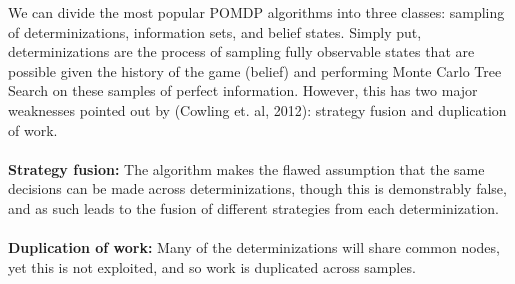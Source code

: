 \documentclass[a4paper,12pt]{proposal}
\begin{document}
We can divide the most popular POMDP algorithms into three classes: sampling of determinizations, information sets, and belief states. Simply put, determinizations are the process of sampling fully observable states that are possible given the history of the game (belief) and performing Monte Carlo Tree Search on these samples of perfect information. However, this has two major weaknesses pointed out by (Cowling et. al, 2012): strategy fusion and duplication of work. 
\\
\\
\textbf{Strategy fusion:} The algorithm makes the flawed assumption that the same decisions can be made across determinizations, though this is demonstrably false, and as such leads to the fusion of different strategies from each determinization.
\\
\\
\textbf{Duplication of work:} Many of the determinizations will share common nodes, yet this is not exploited, and so work is duplicated across samples.
\\
\end{document}
